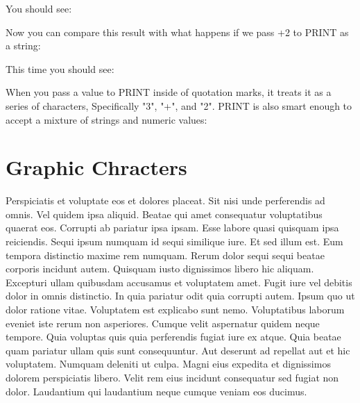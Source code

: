 You should see:\\


Now you can compare this result with what happens if we pass {+2} to
{\ttfamily PRINT} as a string:\\


This time you should see:\\


When you pass a value to {\ttfamily PRINT} inside of quotation marks, it treats
it as a series of characters, Specifically "3", "+", and "2".  {\ttfamily
PRINT} is also smart enough to accept a mixture of strings and numeric
values:\\



\chapter*{Graphic Chracters}

Perspiciatis et voluptate eos et dolores placeat. Sit nisi unde perferendis ad
omnis. Vel quidem ipsa aliquid. Beatae qui amet consequatur voluptatibus
quaerat eos. Corrupti ab pariatur ipsa ipsam. Esse labore quasi quisquam ipsa
reiciendis. Sequi ipsum numquam id sequi similique iure. Et sed illum est. Eum
tempora distinctio maxime rem numquam. Rerum dolor sequi sequi beatae corporis
incidunt autem. Quisquam iusto dignissimos libero hic aliquam. Excepturi ullam
quibusdam accusamus et voluptatem amet. Fugit iure vel debitis dolor in omnis
distinctio. In quia pariatur odit quia corrupti autem. Ipsum quo ut dolor
ratione vitae. Voluptatem est explicabo sunt nemo. Voluptatibus laborum eveniet
iste rerum non asperiores. Cumque velit aspernatur quidem neque tempore. Quia
voluptas quis quia perferendis fugiat iure ex atque. Quia beatae quam pariatur
ullam quis sunt consequuntur. Aut deserunt ad repellat aut et hic voluptatem.
Numquam deleniti ut culpa. Magni eius expedita et dignissimos dolorem
perspiciatis libero. Velit rem eius incidunt consequatur sed fugiat non dolor.
Laudantium qui laudantium neque cumque veniam eos ducimus.

